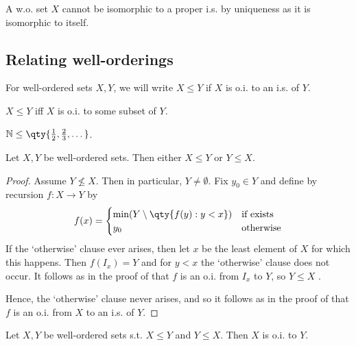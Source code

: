 \begin{remark}
    A w.o. set $X$ cannot be isomorphic to a proper i.s. by uniqueness as it is isomorphic to itself.
\end{remark}

\subsection{Relating well-orderings}
\begin{definition}
    For well-ordered sets $X, Y$, we will write $X \leq Y$ if $X$ is o.i. to an i.s. of $Y$.
\end{definition}

$X \leq Y$ iff $X$ is o.i. to some subset of $Y$.

\begin{example}
    $\mathbb N \leq \qty{\frac{1}{2}, \frac{2}{3}, \dots}$.

\end{example}
\begin{proposition}
    Let $X, Y$ be well-ordered sets.
    Then either $X \leq Y$ or $Y \leq X$.
\end{proposition}

\begin{proof}
    Assume $Y \nleq X$.
    Then in particular, $Y \neq \emptyset$.
    Fix $y_0 \in Y$ and define by recursion $f \colon X \to Y$ by
    \begin{align*}
        f(x) = \begin{cases}
            \min (Y \setminus \qty{f(y) : y < x}) & \text{if exists} \\
            y_0 & \text{otherwise}
        \end{cases}
    \end{align*}
    If the `otherwise' clause ever arises, then let $x$ be the least element of $X$ for which this happens.
    Then $f(I_x) = Y$ and for $y < x$ the `otherwise' clause does not occur.
    It follows as in the proof of  that $f$ is an o.i. from $I_x$ to $Y$, so $Y \leq X$ \Lightning.

    Hence, the `otherwise' clause never arises, and so it follows as in the proof of  that $f$ is an o.i. from $X$ to an i.s. of $Y$.
\end{proof}

\begin{proposition}
    Let $X, Y$ be well-ordered sets s.t. $X \leq Y$ and $Y \leq X$.
    Then $X$ is o.i. to $Y$.
\end{proposition}

